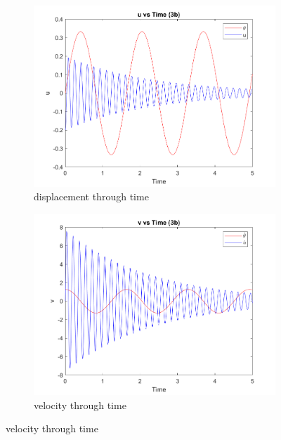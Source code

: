 \documentclass[a4paper,12pt]{article}
\begin{document}
\begin{figure}[h]
  \centering
  \begin{subfigure}[b]{0.5\textwidth}
      \includegraphics[width=\textwidth]{../../Matlab/task3b_plots/u_vs_time.png}
      \caption{displacement through time}
      \label{fig:image7}
  \end{subfigure}
  \hspace{-1.0em}%
  \begin{subfigure}[b]{0.5\textwidth}
      \includegraphics[width=\textwidth]{../../Matlab/task3b_plots/v_vs_time.png}
      \caption{velocity through time}
      \label{fig:image8}
  \end{subfigure}


\end{figure}
\end{document}
